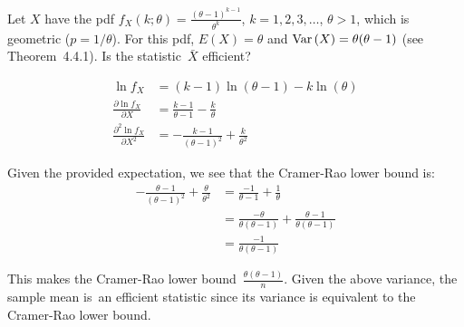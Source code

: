 \begin{problem}
   Let $X$ have the pdf ${f_{X}(k;\theta) = \frac{(\theta - 1)^{k-1}}{\theta^{k}}}$, ${k=1,2,3,\ldots}$, ${\theta > 1}$, which is geometric (${p = 1 / \theta}$). For this pdf, ${E(X) = \theta}$ and ${\text{Var}\left(X\right) = \theta (\theta - 1)}$ (see Theorem~4.4.1).  Is the statistic~$\bar{X}$ efficient?
\end{problem}

\begin{align*}
  \ln f_X &= (k-1)\ln(\theta - 1) - k \ln(\theta) \\
  \frac{\partial \ln f_X}{\partial X} &= \frac{k-1}{\theta - 1} - \frac{k}{\theta} \\
  \frac{\partial^2 \ln f_X}{\partial X^2} &= -\frac{k-1}{\left(\theta - 1\right)^2} + \frac{k}{\theta^{2}}
\end{align*}

Given the provided expectation, we see that the Cramer-Rao lower bound is:
\begin{align}
  -\frac{\theta-1}{\left(\theta - 1\right)^2} + \frac{\theta}{\theta^{2}} &= \frac{-1}{\theta - 1} + \frac{1}{\theta} \\
                                                                          &= \frac{-\theta}{\theta(\theta - 1)} + \frac{\theta - 1}{\theta(\theta - 1)} \\
                                                                          &= \frac{-1}{\theta(\theta - 1)}
\end{align}

This makes the Cramer-Rao lower bound~$\frac{\theta(\theta - 1)}{n}$.  Given the above variance, the sample mean is~an efficient statistic since its variance is equivalent to the Cramer-Rao lower bound.
